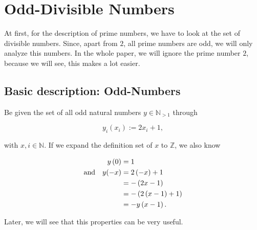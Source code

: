 \chapter{Odd-Divisible Numbers}
\label{ch:odddivisiblenumbers}
\minitoc
At first, for the description of prime numbers, we have to look at the set of divisible numbers. Since, apart from $2$, all prime numbers are odd, we will only analyze this numbers. In the whole paper, we will ignore the prime number $2$, because we will see, this makes a lot easier.
\section{Basic description: Odd-Numbers}
\label{s:basicdescriptionoddnumbers}
Be given the set of all odd natural numbers $y \in \mathbb{N}_{> 1}$ through

\begin{equation}
y_{i}\left(x_{i}\right) := 2x_{i} + 1,
\label{eq:oddnatnumbers}
\end{equation}

with $x,i \in \mathbb{N}$. If we expand the definition set of $x$ to $\mathbb{Z}$, we also know

\begin{alignat}{3}
	y\left(0\right) &= 1 \\
	\mathrm{and} \quad y(-x) &= 2\left(-x\right) + 1 \notag \\
	&= -\left(2x - 1\right) \notag \\
	&= -\left(2\left(x-1\right) + 1\right) \notag \\ 
	&= -y\left(x-1\right).
\label{eq:xexpandtoZ}
\end{alignat}

Later, we will see that this properties can be very useful.
